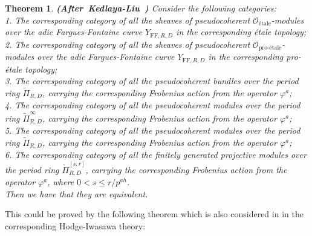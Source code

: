 \documentclass[12pt]{amsart}
\newtheorem{theorem}{Theorem}[section]
\theoremstyle{definition}
\numberwithin{equation}{section}
\begin{document}
\begin{theorem} \mbox{\bf{(After Kedlaya-Liu \cite[Theorem 4.6.1]{KL2})}} \label{theorem3.10}
Consider the following categories:\\
1. The corresponding category of all the sheaves of pseudocoherent $\mathcal{O}_{\text{\'etale}}$-modules over the adic Fargues-Fontaine curve $Y_{\mathrm{FF},R,D}$ in the corresponding \'etale topology;\\
2. The corresponding category of all the sheaves of pseudocoherent $\mathcal{O}_{\text{pro-\'etale}}$-modules over the adic Fargues-Fontaine curve $Y_{\mathrm{FF},R,D}$ in the corresponding pro-\'etale topology;\\
3. The corresponding category of all the pseudocoherent bundles over the period ring $\widetilde{\Pi}_{R,D}$, carrying the corresponding Frobenius action from the operator $\varphi^a$;\\
4. The corresponding category of all the pseudocoherent modules over the period ring $\widetilde{\Pi}^{\infty}_{R,D}$, carrying the corresponding Frobenius action from the operator $\varphi^a$;\\
5. The corresponding category of all the pseudocoherent modules over the period ring $\widetilde{\Pi}^{}_{R,D}$, carrying the corresponding Frobenius action from the operator $\varphi^a$;\\
6. The corresponding category of all the finitely generated projective modules over the period ring $\widetilde{\Pi}^{[s,r]}_{R,D}$, carrying the corresponding Frobenius action from the operator $\varphi^a$, where $0<s\leq r/p^{ah}$.\\
Then we have that they are equivalent.
\end{theorem}


This could be proved by the following theorem which is also considered in \cite{T2} in the corresponding Hodge-Iwasawa theory:
\end{document}
